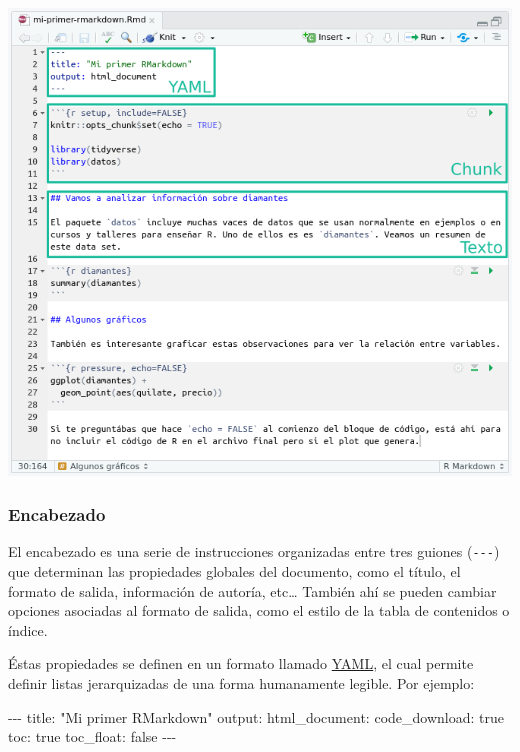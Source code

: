 \documentclass[
  letterpaper,
  DIV=11,
  numbers=noendperiod]{scrartcl}
\newenvironment{Shaded}{\begin{snugshade}}{\end{snugshade}}
\newcommand{\AttributeTok}[1]{\textcolor[rgb]{0.40,0.45,0.13}{#1}}
\newcommand{\CharTok}[1]{\textcolor[rgb]{0.13,0.47,0.30}{#1}}
\newcommand{\FunctionTok}[1]{\textcolor[rgb]{0.28,0.35,0.67}{#1}}
\newcommand{\KeywordTok}[1]{\textcolor[rgb]{0.00,0.23,0.31}{#1}}
\newcommand{\PreprocessorTok}[1]{\textcolor[rgb]{0.68,0.00,0.00}{#1}}
\newcommand{\StringTok}[1]{\textcolor[rgb]{0.13,0.47,0.30}{#1}}
\begin{document}
\includegraphics{img/rmd-ejemplo-secciones.png}

\hypertarget{encabezado}{%
\subsubsection{Encabezado}\label{encabezado}}

El encabezado es una serie de instrucciones organizadas entre tres
guiones (\texttt{-\/-\/-}) que determinan las propiedades globales del
documento, como el título, el formato de salida, información de autoría,
etc\ldots{} También ahí se pueden cambiar opciones asociadas al formato
de salida, como el estilo de la tabla de contenidos o índice.

Éstas propiedades se definen en un formato llamado
\href{https://es.wikipedia.org/wiki/YAML}{YAML}, el cual permite definir
listas jerarquizadas de una forma humanamente legible. Por ejemplo:

\begin{Shaded}
\begin{Highlighting}[]
\PreprocessorTok{{-}{-}{-}}
\FunctionTok{title}\KeywordTok{:}\AttributeTok{ }\StringTok{"Mi primer RMarkdown"}
\FunctionTok{output}\KeywordTok{:}\AttributeTok{ }
\AttributeTok{  }\FunctionTok{html\_document}\KeywordTok{:}
\AttributeTok{    }\FunctionTok{code\_download}\KeywordTok{:}\AttributeTok{ }\CharTok{true}
\AttributeTok{    }\FunctionTok{toc}\KeywordTok{:}\AttributeTok{ }\CharTok{true}
\AttributeTok{    }\FunctionTok{toc\_float}\KeywordTok{:}\AttributeTok{ }\CharTok{false}
\PreprocessorTok{{-}{-}{-}}
\end{Highlighting}
\end{Shaded}
\end{document}
